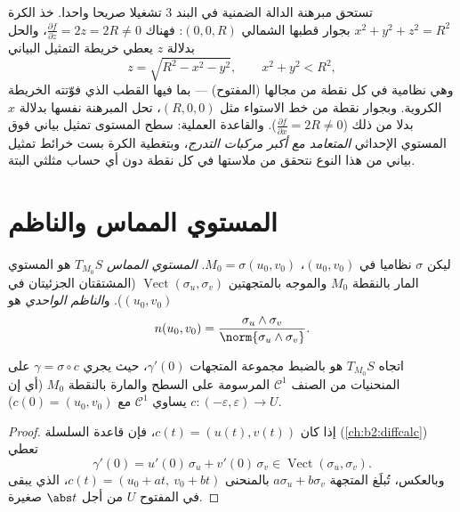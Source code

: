 \begin{example}
\label{ex:b2:surfaces:levelgraph}
تستحق مبرهنة الدالة الضمنية في البند 3 تشغيلا صريحا واحدا. خذ الكرة
$x^2 + y^2 + z^2 = R^2$ بجوار قطبها الشمالي $(0, 0, R)$: فهناك $\frac{\partial f}{\partial z} = 2z =
2R \neq 0$، والحل بدلالة $z$
يعطي خريطة التمثيل البياني
\[
z = \sqrt{R^2 - x^2 - y^2},
\qquad x^2 + y^2 < R^2 ,
\]
وهي نظامية في كل نقطة من مجالها (المفتوح) --- بما فيها القطب الذي
فوّتته الخريطة الكروية. وبجوار نقطة من خط الاستواء مثل $(R, 0, 0)$، تحل
المبرهنة نفسها بدلالة $x$ بدلا من ذلك ($\frac{\partial f}{\partial x} = 2R \neq 0$). والقاعدة العملية:
سطح المستوى تمثيل بياني فوق المستوي الإحداثي \emph{المتعامد مع أكبر
مركبات التدرج}، وبتغطية الكرة بست خرائط تمثيل بياني من هذا النوع
نتحقق من ملاستها في كل نقطة دون أي حساب مثلثي البتة.
\end{example}

\section{المستوي المماس والناظم}

\begin{definition}\label{def:b2:surfaces:tangent}
ليكن $\sigma$ نظاميا في $(u_0, v_0)$، $M_0 = \sigma(u_0, v_0)$. \emph{المستوي المماس}
$T_{M_0}S$ هو المستوي المار بالنقطة $M_0$ والموجه بالمتجهتين $\operatorname{Vect}(\sigma_u, \sigma_v)$
(المشتقتان الجزئيتان في $(u_0, v_0)$). و\emph{الناظم الواحدي}
هو
\[
n(u_0, v_0)
= \frac{\sigma_u \wedge \sigma_v}
       {\norm{\sigma_u \wedge \sigma_v}} .
\]
\end{definition}

\begin{proposition}\label{prop:b2:surfaces:velocity}
اتجاه $T_{M_0}S$ هو بالضبط مجموعة المتجهات $\gamma'(0)$، حيث يجري $\gamma = \sigma \circ c$ على
المنحنيات من الصنف $\mathcal{C}^1$ المرسومة على السطح والمارة بالنقطة $M_0$
(أي إن $c \colon (-\varepsilon, \varepsilon) \to U$ يساوي $\mathcal{C}^1$ مع $c(0) = (u_0, v_0)$).
\end{proposition}

\begin{proof}
إذا كان $c(t) = (u(t), v(t))$، فإن قاعدة السلسلة (\cref{ch:b2:diffcalc}) تعطي
\[
\gamma'(0) = u'(0)\,\sigma_u + v'(0)\,\sigma_v
\in \operatorname{Vect}(\sigma_u, \sigma_v).
\]
وبالعكس، تُبلَغ المتجهة $a\sigma_u + b\sigma_v$ بالمنحنى $c(t) = (u_0 + at,\ v_0 + bt)$، الذي يبقى في المفتوح
$U$ من أجل $\abs t$ صغيرة.
\end{proof}

